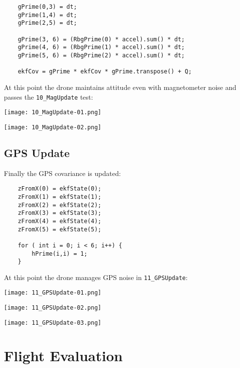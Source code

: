 \documentclass{article}
\begin{document}
\begin{verbatim}
    gPrime(0,3) = dt;
    gPrime(1,4) = dt;
    gPrime(2,5) = dt;

    gPrime(3, 6) = (RbgPrime(0) * accel).sum() * dt;
    gPrime(4, 6) = (RbgPrime(1) * accel).sum() * dt;
    gPrime(5, 6) = (RbgPrime(2) * accel).sum() * dt;

    ekfCov = gPrime * ekfCov * gPrime.transpose() + Q;
\end{verbatim}

At this point the drone maintains attitude even with magnetometer
noise and passes the \texttt{10\_MagUpdate} test:

\begin{center}
    \texttt{[image: 10\_MagUpdate-01.png]}
\end{center}

\begin{center}
    \texttt{[image: 10\_MagUpdate-02.png]}
\end{center}

\newpage
\subsection{GPS Update}

Finally the GPS covariance is updated:

\begin{verbatim}
    zFromX(0) = ekfState(0);
    zFromX(1) = ekfState(1);
    zFromX(2) = ekfState(2);
    zFromX(3) = ekfState(3);
    zFromX(4) = ekfState(4);
    zFromX(5) = ekfState(5);

    for ( int i = 0; i < 6; i++) {
        hPrime(i,i) = 1;
    }
\end{verbatim}

At this point the drone manages GPS noise in \texttt{11\_GPSUpdate}:

\begin{center}
    \texttt{[image: 11\_GPSUpdate-01.png]}
\end{center}

\begin{center}
    \texttt{[image: 11\_GPSUpdate-02.png]}
\end{center}

\begin{center}
    \texttt{[image: 11\_GPSUpdate-03.png]}
\end{center}

\section{Flight Evaluation}
\end{document}
